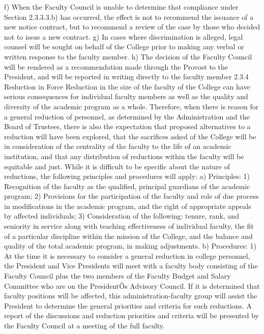 \documentclass[letterpaper, 11pt]{article}
\begin{document}
	f) When the Faculty Council is unable to determine that compliance under Section 2.3.3.3.b) has occurred, the effect is not to recommend the issuance of a new notice contract, but to recommend a review of the case by those who decided not to issue a new contract.
	g) In cases where discrimination is alleged, legal counsel will be sought on behalf of the College prior to making any verbal or written response to the faculty member.
	h) The decision of the Faculty Council will be rendered as a recommendation made through the Provost to the President, and will be reported in writing directly to the faculty member
	2.3.4 Reduction in Force
	Reduction in the size of the faculty of the College can have serious consequences for individual faculty members as well as the quality and diversity of the academic program as a whole.  Therefore, when there is reason for a general reduction of personnel, as determined by the Administration and the Board of Trustees, there is also the expectation that proposed alternatives to a reduction will have been explored, that the sacrifices asked of the College will be in consideration of the centrality of the faculty to the life of an academic institution, and that any distribution of reductions within the faculty will be equitable and just.  While it is difficult to be specific about the nature of reductions, the following principles and procedures will apply:
	a) Principles:
	1) Recognition of the faculty as the qualified, principal guardians of the academic program;
	2) Provisions for the participation of the faculty and role of due process in modifications in the academic program, and the right of appropriate appeals by affected individuals;
	3) Consideration of the following: tenure, rank, and seniority in service along with teaching effectiveness of individual faculty, the fit of a particular discipline within the mission of the College, and the balance and quality of the total academic program, in making adjustments.
	b) Procedures:
	1) At the time it is necessary to consider a general reduction in college personnel, the President and Vice Presidents will meet with a faculty body consisting of the Faculty Council plus the two members of the Faculty Budget and Salary Committee who are on the PresidentÕs Advisory Council.  If it is determined that faculty positions will be affected, this administration-faculty group will assist the President to determine the general priorities and criteria for such reductions. A report of the discussions and reduction priorities and criteria will be presented by the Faculty Council at a meeting of the full faculty.
\end{document}
